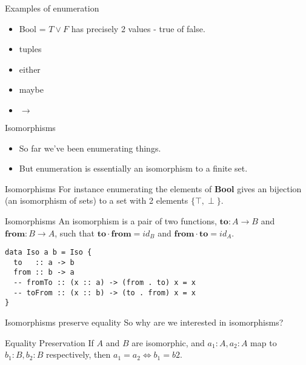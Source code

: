\documentclass[tikz]{beamer}
\theoremstyle{definition}
\begin{document}
\begin{frame}{Examples of enumeration}
    
    \begin{itemize}
    	\item Bool = $T \lor F$ has precisely 2 values - true of false.
	\item tuples
	\item either
	\item maybe
	\item $\to$
    \end{itemize}
    
\end{frame}{}

\begin{frame}{Isomorphisms}
	\begin{itemize}   
	\item So far we've been enumerating things. 
	\item But enumeration is essentially an isomorphism to a finite set.
	\end{itemize}
\end{frame}

\begin{frame}{Isomorphisms}
	For instance enumerating the elements of \textbf{Bool} gives an bijection (an isomorphism of sets) to a set with 2 elements $\{\top, \perp\}$. 
\end{frame}

\begin{frame}[fragile]{Isomorphisms}
An isomorphism is a pair of two functions, $\mathbf{to}: A \to B$ and $\mathbf{from}: B \to A$, such that $\mathbf{to} \cdot \mathbf{from} = id_B$ and $\mathbf{from} \cdot \mathbf{to} = id_A$.
    
\begin{verbatim}
data Iso a b = Iso {
  to   :: a -> b
  from :: b -> a
  -- fromTo :: (x :: a) -> (from . to) x = x
  -- toFrom :: (x :: b) -> (to . from) x = x
}
\end{verbatim}
\end{frame}

\begin{frame}[fragile]{Isomorphisms preserve equality}
So why are we interested in isomorphisms?

\begin{block}{Equality Preservation}
    If $A$ and $B$ are isomorphic, and $a_1: A, a_2: A$ map to $b_1: B, b_2: B$ respectively, then $a_1 = a_2 \iff b_1 = b2$.
\end{block}
\end{frame}
\end{document}
